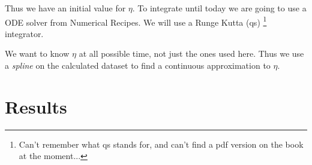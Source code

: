 \documentclass[a4paper,norsk, 10pt]{article}
\begin{document}
Thus we have an initial value for $\eta$. To integrate until today we are going to use a ODE solver from Numerical Recipes. We will use a Runge Kutta (qs) \footnote{Can't remember what qs stands for, and can't find a pdf version on the book at the moment...} integrator. 

We want to know $\eta$ at all possible time, not just the ones used here. Thus we use a \textit{spline} on the calculated dataset to find a continuous approximation to $\eta$.



\newpage

\section{Results}


\begin{figure}[ht]
     \centering

\end{figure}
\end{document}
